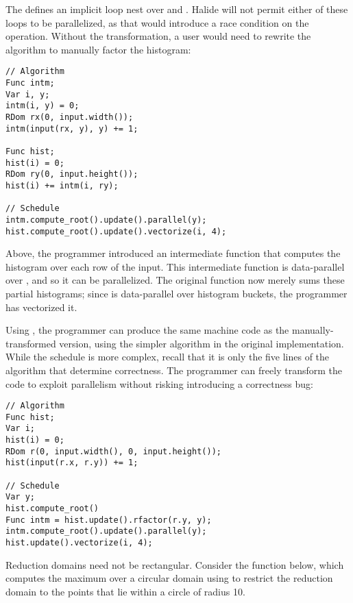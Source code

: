 The  defines an implicit loop nest over  and . Halide will not permit either of these loops to be parallelized, as that would introduce a race condition on the \code{+=} operation. Without the  transformation, a user would need to rewrite the algorithm to manually factor the histogram:

\begin{minipage}{\linewidth}
\begin{lstlisting}
// Algorithm
Func intm;
Var i, y;
intm(i, y) = 0;
RDom rx(0, input.width());
intm(input(rx, y), y) += 1;

Func hist;
hist(i) = 0;
RDom ry(0, input.height());
hist(i) += intm(i, ry);

// Schedule
intm.compute_root().update().parallel(y);
hist.compute_root().update().vectorize(i, 4);
\end{lstlisting}
\end{minipage}

Above, the programmer introduced an intermediate function  that computes the histogram over each row of the input. This intermediate function is data-parallel over , and so it can be parallelized. The original function  now merely sums these partial histograms; since  is data-parallel over histogram buckets, the programmer has vectorized it.

Using , the programmer can produce the same machine code as the manually-transformed version, using the simpler algorithm in the original  implementation. While the schedule is more complex, recall that it is only the five lines of the algorithm that determine correctness. The programmer can freely transform the code to exploit parallelism without risking introducing a correctness bug:

\begin{minipage}{\linewidth}
\begin{lstlisting}
// Algorithm
Func hist;
Var i;
hist(i) = 0;
RDom r(0, input.width(), 0, input.height());
hist(input(r.x, r.y)) += 1;

// Schedule
Var y;
hist.compute_root()
Func intm = hist.update().rfactor(r.y, y);
intm.compute_root().update().parallel(y);
hist.update().vectorize(i, 4);
\end{lstlisting}
\end{minipage}

Reduction domains need not be rectangular. Consider the function below, which computes the maximum over a circular domain using  to restrict the reduction domain to the points that lie within a circle of radius 10.

